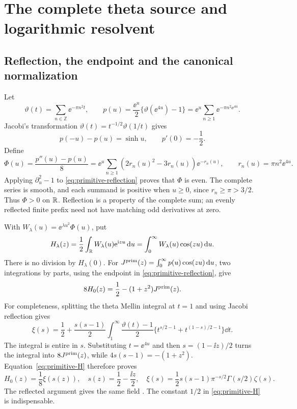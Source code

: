 \section{The complete theta source and logarithmic resolvent}\label{sec:source}

\subsection{Reflection, the endpoint and the canonical normalization}

Let
\[
 \vartheta(t)=\sum_{n\in\mathbb Z}\ee^{-\pi n^2t},\qquad
 p(u)=\frac{\ee^u}{2}\{\vartheta(\ee^{4u})-1\}
     =\ee^u\sum_{n\ge1}\ee^{-\pi n^2\ee^{4u}}.
\]
Jacobi's transformation
\(\vartheta(t)=t^{-1/2}\vartheta(1/t)\)
\cite{DLMFThetaModular} gives
\begin{equation}\label{eq:primitive-reflection}
 p(-u)-p(u)=\sinh u,\qquad p'(0)=-\frac12.
\end{equation}
Define
\begin{equation}\label{eq:source}
 \Phi(u)=\frac{p''(u)-p(u)}8
 =\ee^u\sum_{n\ge1}(2r_n(u)^2-3r_n(u))\ee^{-r_n(u)},
 \qquad r_n(u)=\pi n^2\ee^{4u}.
\end{equation}
Applying \(\partial_u^2-1\) to \eqref{eq:primitive-reflection}
proves that \(\Phi\) is even. The complete series is smooth, and
each summand is positive when \(u\ge0\), since \(r_n\ge\pi>3/2\).
Thus \(\Phi>0\) on \(\mathbb R\). Reflection is a property of the complete
sum; an evenly reflected finite prefix need not have matching odd
derivatives at zero.

With \(W_\lambda(u)=\ee^{\lambda u^2}\Phi(u)\), put
\begin{equation}\label{eq:H}
 H_\lambda(z)=\frac12\int_\mathbb R W_\lambda(u)\mathrm e^{\mathrm i zu}\,\mathrm d u
            =\int_0^\infty W_\lambda(u)\cos(zu)\,\mathrm d u.
\end{equation}
There is no division by \(H_\lambda(0)\).
For \(J^{\rm prim}(z)=\int_0^\infty p(u)\cos(zu)\,\mathrm d u\),
two integrations by parts, using the endpoint in
\eqref{eq:primitive-reflection}, give
\begin{equation}\label{eq:primitive-H}
 8H_0(z)=\frac12-(1+z^2)J^{\rm prim}(z).
\end{equation}
For completeness, splitting the theta Mellin integral at \(t=1\)
and using Jacobi reflection gives
\[
 \xi(s)=\frac12+\frac{s(s-1)}2
 \int_1^\infty \frac{\vartheta(t)-1}{2}
       \{t^{s/2-1}+t^{(1-s)/2-1}\}\dd t.
\]
The integral is entire in \(s\). Substituting \(t=\ee^{4u}\)
and then \(s=(1-\ii z)/2\) turns the integral into
\(8J^{\rm prim}(z)\), while \(4s(s-1)=-(1+z^2)\).
Equation~\eqref{eq:primitive-H} therefore proves
\begin{equation}\label{eq:xi}
 H_0(z)=\frac18\xi(s(z)),\quad
 s(z)=\frac12-\frac{\ii z}2,\quad
 \xi(s)=\frac12s(s-1)\pi^{-s/2}\Gamma(s/2)\zeta(s).
\end{equation}
The reflected argument gives the same field
\cite{DLMFGreenPrime}. The constant \(1/2\) in
\eqref{eq:primitive-H} is indispensable.

